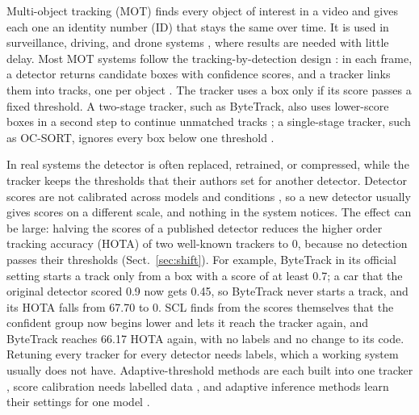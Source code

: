 \documentclass[pdflatex,sn-mathphys-num,iicol]{sn-jnl}
\makeatletter
\newcommand{\scl}{SCL}
\renewcommand\section{\@startsection{section}{1}{\z@}{-10pt \@plus -3pt \@minus -2pt}{6pt}{\sectionfont}}
\makeatother
\begin{document}
\maketitle

\section{Introduction}\label{sec:intro}

Multi-object tracking (MOT) finds every object of interest in a video and gives each one an
identity number (ID) that stays the same over time. It is used in surveillance, driving, and drone
systems \cite{zhu2022visdrone}, where results are needed with little delay. Most
MOT systems follow the tracking-by-detection design \cite{adzemovic2026survey}: in each frame, a
detector returns candidate boxes with confidence scores, and a tracker links them into tracks, one
per object \cite{bewley2016sort,zhang2022bytetrack,cao2023ocsort}. The tracker uses a box only if
its score passes a fixed threshold. A two-stage tracker, such as ByteTrack, also uses lower-score
boxes in a second step to continue unmatched tracks \cite{zhang2022bytetrack}; a single-stage
tracker, such as OC-SORT, ignores every box below one threshold \cite{cao2023ocsort}.

In real systems the detector is often replaced, retrained, or compressed, while the tracker keeps
the thresholds that their authors set for another detector. Detector scores are not calibrated across
models and conditions \cite{kuppers2020detcalib}, so a new detector usually gives scores on a
different scale, and nothing in the system notices. The effect can be large: halving the scores of
a published detector reduces the higher order tracking accuracy (HOTA) \cite{luiten2021hota} of two
well-known trackers to 0, because no detection passes their thresholds (Sect.~\ref{sec:shift}). For example, ByteTrack in
its official setting starts a track only from a box with a score of at least 0.7; a car that the
original detector scored 0.9 now gets 0.45, so ByteTrack never starts a track, and its HOTA falls
from 67.70 to 0. \scl{} finds from the scores themselves that the confident group now begins
lower and lets it reach the tracker again, and ByteTrack reaches 66.17 HOTA again, with no labels and no change to its code.
Retuning every tracker for every detector needs labels, which a working system usually does not
have. Adaptive-threshold methods are each built into one tracker
\cite{ma2023adaptivebytetrack,shim2024adaptrack,act2026adaptive}, score calibration needs
labelled data \cite{kuppers2020detcalib}, and adaptive inference methods learn their settings for
one model \cite{han2022dynamic}.
\end{document}
